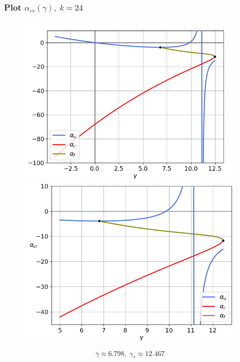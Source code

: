 \documentclass[fullscreen=true, unicode, bookmarks=false]{beamer}
\begin{document}
\begin{frame}
\frametitle{ Plot $ \alpha_{cr}(\gamma), \; k = 24 $ }

\begin{figure} 
\begin{minipage}[h]{0.49\linewidth}
\begin{center}
\includegraphics[scale=0.37]{alphas_047.png} 
\end{center}
\end{minipage} 
\hfill
\begin{minipage}[h]{0.49\linewidth}
\begin{center}
\includegraphics[scale=0.37]{alphas_intersection_047.png}
\end{center}
\end{minipage} 
\end{figure}

$$ \overline{\gamma} \approx 6.798, \; \gamma_* \approx 12.467 $$

\end{frame}
\end{document}
